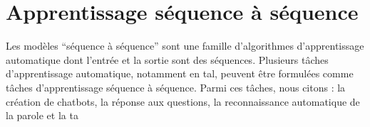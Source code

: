 \chapter{Apprentissage séquence à séquence}

Les modèles ``séquence à séquence'' sont une famille d'algorithmes d'apprentissage automatique
dont l'entrée et la sortie sont des séquences.
Plusieurs tâches d'apprentissage automatique, notamment en \acrshort{tal}, 
peuvent être formulées comme tâches d'apprentissage séquence à séquence.
Parmi ces tâches, nous citons : la création de chatbots, la réponse aux questions, 
la reconnaissance automatique de la parole et la \acrlong{ta}
